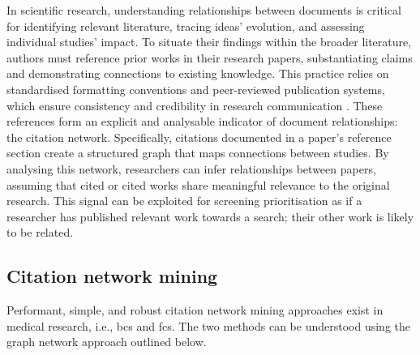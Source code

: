 \documentclass[10pt,oneside]{book}
\begin{document}
In scientific research, understanding relationships between documents is critical for identifying relevant literature, tracing ideas' evolution, and assessing individual studies' impact. To situate their findings within the broader literature, authors must reference prior works in their research papers, substantiating claims and demonstrating connections to existing knowledge. This practice relies on standardised formatting conventions and peer-reviewed publication systems, which ensure consistency and credibility in research communication \cite{noauthor_bmc_nodate}. These references form an explicit and analysable indicator of document relationships: the citation network. Specifically, citations documented in a paper's reference section create a structured graph that maps connections between studies. By analysing this network, researchers can infer relationships between papers, assuming that cited or cited works share meaningful relevance to the original research. This signal can be exploited for screening prioritisation as if a researcher has published relevant work towards a search; their other work is likely to be related.

\subsection{Citation network mining}

Performant, simple, and robust citation network mining approaches exist in medical research, i.e., \gls*{bcs} and \gls*{fcs}. The two methods can be understood using the graph network approach outlined below.
\end{document}
